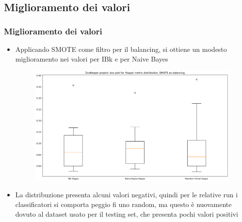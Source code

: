\documentclass[10pt]{beamer}
\begin{document}
\begin{frame}
\subsection{Miglioramento dei valori}
\frametitle{Miglioramento dei valori}
\begin{itemize}
\item Applicando SMOTE come filtro per il balancing, si ottiene un modesto miglioramento nei valori per IBk e per Naive Bayes
\begin{figure}
\includegraphics[scale=0.25]{images/k_bett_zk}
\end{figure}
\item La distribuzione presenta alcuni valori negativi, quindi per le relative run i classificatori si comporta peggio fi uno random, ma questo è nuovamente dovuto al dataset usato per il testing set, che presenta pochi valori positivi
\end{itemize}
\end{frame}
\end{document}
